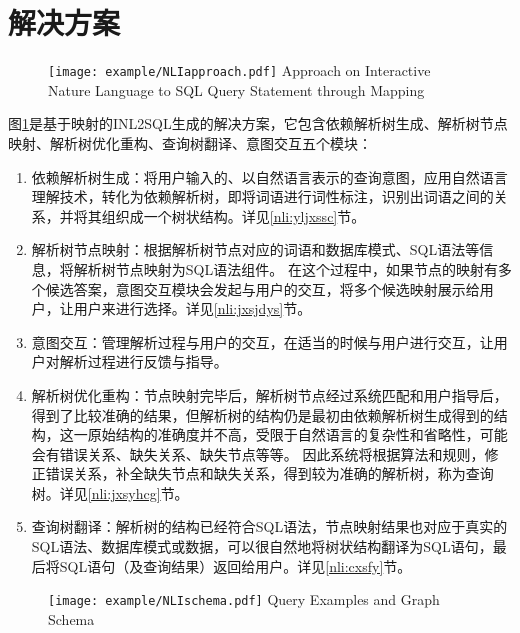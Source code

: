 \section{解决方案}
\begin{figure}[!htp]
    \centering
    \texttt{[image: example/NLIapproach.pdf]}
      {Approach on Interactive Nature Language to SQL Query Statement through Mapping}
    \label{fig:NLIapproach}
  \end{figure}

图\ref{fig:NLIapproach}是基于映射的INL2SQL生成的解决方案，它包含依赖解析树生成、解析树节点映射、解析树优化重构、查询树翻译、意图交互五个模块：
\begin{enumerate}
    \item 依赖解析树生成：将用户输入的、以自然语言表示的查询意图，应用自然语言理解技术，转化为依赖解析树，即将词语进行词性标注，识别出词语之间的关系，并将其组织成一个树状结构。详见\ref{nli:yljxssc}节。
    \item 解析树节点映射：根据解析树节点对应的词语和数据库模式、SQL语法等信息，将解析树节点映射为SQL语法组件。
在这个过程中，如果节点的映射有多个候选答案，意图交互模块会发起与用户的交互，将多个候选映射展示给用户，让用户来进行选择。详见\ref{nli:jxsjdys}节。
    \item 意图交互：管理解析过程与用户的交互，在适当的时候与用户进行交互，让用户对解析过程进行反馈与指导。
    \item 解析树优化重构：节点映射完毕后，解析树节点经过系统匹配和用户指导后，得到了比较准确的结果，但解析树的结构仍是最初由依赖解析树生成得到的结构，这一原始结构的准确度并不高，受限于自然语言的复杂性和省略性，可能会有错误关系、缺失关系、缺失节点等等。
因此系统将根据算法和规则，修正错误关系，补全缺失节点和缺失关系，得到较为准确的解析树，称为查询树。详见\ref{nli:jxsyhcg}节。
    \item 查询树翻译：解析树的结构已经符合SQL语法，节点映射结果也对应于真实的SQL语法、数据库模式或数据，可以很自然地将树状结构翻译为SQL语句，最后将SQL语句（及查询结果）返回给用户。详见\ref{nli:cxsfy}节。
\end{enumerate}

\begin{figure}[!htp]
  \centering
  \texttt{[image: example/NLIschema.pdf]}
    {Query Examples and Graph Schema}
  \label{fig:NLIschema}
\end{figure}

